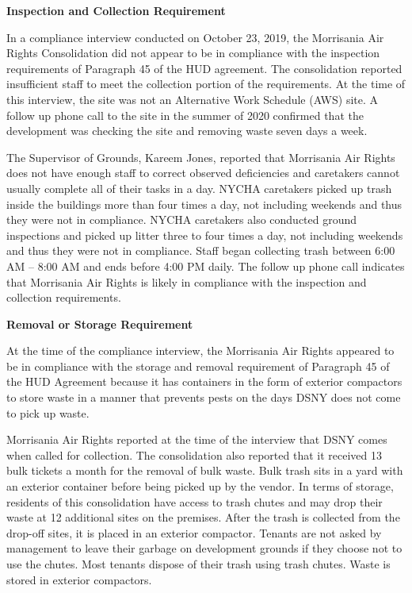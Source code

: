 

\textbf{Inspection and Collection Requirement}

In a compliance interview conducted on October 23, 2019, the Morrisania Air Rights Consolidation did not appear to be in compliance with the inspection requirements of Paragraph 45 of the HUD agreement. The consolidation reported insufficient staff to meet the collection portion of the requirements. At the time of this interview, the site was not an Alternative Work Schedule (AWS) site.  A follow up phone call to the site in the summer of 2020 confirmed that the development was checking the site and removing waste seven days a week.

The Supervisor of Grounds, Kareem Jones, reported that Morrisania Air Rights does not have enough staff to correct observed deficiencies and caretakers cannot usually complete all of their tasks in a day. NYCHA caretakers picked up trash inside the buildings more than four times a day, not including weekends and thus they were not in compliance. NYCHA caretakers also conducted ground inspections and picked up litter three to four times a day, not including weekends and thus they were not in compliance. Staff began collecting trash between 6:00 AM -- 8:00 AM and ends before 4:00 PM daily. The follow up phone call indicates that Morrisania Air Rights is likely in compliance with the inspection and collection requirements.

\textbf{Removal or Storage Requirement}

At the time of the compliance interview, the Morrisania Air Rights appeared to be in compliance with the storage and removal requirement of Paragraph 45 of the HUD Agreement because it has containers in the form of exterior compactors to store waste in a manner that prevents pests on the days DSNY does not come to pick up waste.

Morrisania Air Rights reported at the time of the interview that DSNY comes when called for collection. The consolidation also reported that it received 13 bulk tickets a month for the removal of bulk waste. Bulk trash sits in a yard with an exterior container before being picked up by the vendor. In terms of storage, residents of this consolidation have access to trash chutes and may drop their waste at 12 additional sites on the premises. After the trash is collected from the drop-off sites, it is placed in an exterior compactor. Tenants are not asked by management to leave their garbage on development grounds if they choose not to use the chutes. Most tenants dispose of their trash using trash chutes. Waste is stored in exterior compactors. 

